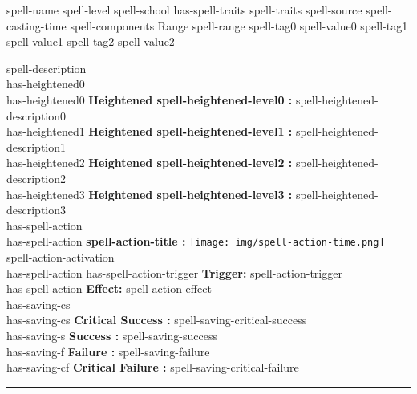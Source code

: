 \documentclass{article}
\begin{document}
\begin{spell}
{spell-name} %
{spell-level} %
{spell-school has-spell-traits spell-traits} %
{spell-source} %
{spell-casting-time} %
{spell-components} %
{Range} {spell-range}
{spell-tag0} {spell-value0}
{spell-tag1} {spell-value1}
{spell-tag2} {spell-value2}
    \begingroup
        \par\fontsize{8pt}{10pt}\selectfont
        \vspace{7mm}   %
        spell-description\\ has-heightened0 \\
        
        has-heightened0 \textbf{Heightened spell-heightened-level0 :} spell-heightened-description0\\
        has-heightened1 \textbf{Heightened spell-heightened-level1 :} spell-heightened-description1\\
        has-heightened2 \textbf{Heightened spell-heightened-level2 :} spell-heightened-description2\\
        has-heightened3 \textbf{Heightened spell-heightened-level3 :} spell-heightened-description3\\ has-spell-action \\

        has-spell-action \textbf{spell-action-title :} \texttt{[image: img/spell-action-time.png]} spell-action-activation\\
        has-spell-action has-spell-action-trigger \textbf{Trigger:} spell-action-trigger\\
        has-spell-action \textbf{Effect:} spell-action-effect\\ has-saving-cs \\

        has-saving-cs \textbf{Critical Success :} spell-saving-critical-success\\
        has-saving-s \textbf{Success :} spell-saving-success\\
        has-saving-f \textbf{Failure :} spell-saving-failure\\
        has-saving-cf \textbf{Critical Failure :} spell-saving-critical-failure\\
        \rule{\textwidth}{0.5pt}
    \endgroup
\end{spell}
\end{document}
